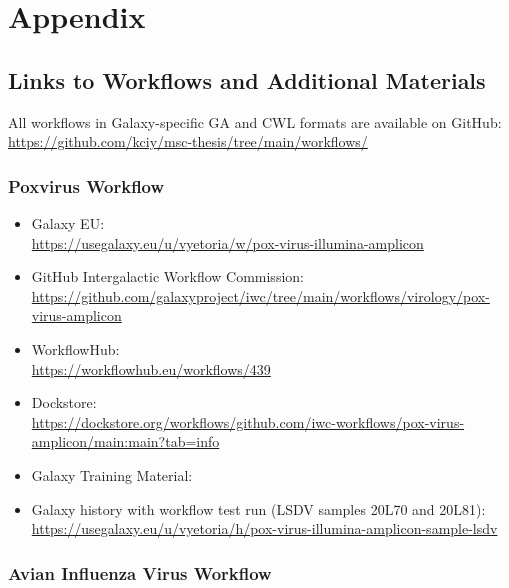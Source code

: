 \chapter*{Appendix}
\label{chap:appendix}

\vspace*{-16pt}
\section*{\thesection \quad Links to Workflows and Additional Materials}
\hspace*{-18pt}All workflows in Galaxy-specific GA and CWL formats are available on GitHub:\\
\url{https://github.com/kciy/msc-thesis/tree/main/workflows/}

\subsection*{\thesubsection \quad Poxvirus Workflow}
\label{sec:apx-pox-links}

\begin{itemize}
	\setlength{\itemsep}{-0.4cm}
	\item Galaxy EU:\\
	\url{https://usegalaxy.eu/u/vyetoria/w/pox-virus-illumina-amplicon}
	\item GitHub Intergalactic Workflow Commission:\\
	\url{https://github.com/galaxyproject/iwc/tree/main/workflows/virology/pox-virus-amplicon}
	\item WorkflowHub:\\
	\url{https://workflowhub.eu/workflows/439}
	\item Dockstore:\\
	\url{https://dockstore.org/workflows/github.com/iwc-workflows/pox-virus-amplicon/main:main?tab=info}
	\item Galaxy Training Material: \todoit
	\item Galaxy history with workflow test run (\ac{LSDV} samples 20L70 and 20L81):\\
	\url{https://usegalaxy.eu/u/vyetoria/h/pox-virus-illumina-amplicon-sample-lsdv} 
\end{itemize}

\subsection*{\thesubsection \quad Avian Influenza Virus Workflow}
\label{sec:apx-aiv-links}


